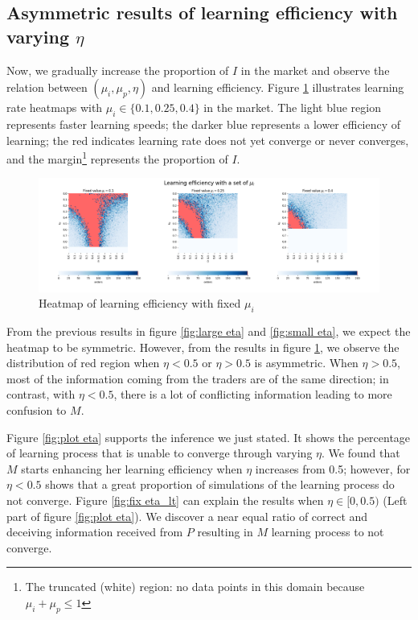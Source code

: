 \documentclass{article}
\begin{document}
\subsection{Asymmetric results of learning efficiency with varying $\eta$}
Now, we gradually increase the proportion of $I$ in the market and observe the relation between $(\mu_i, \mu_p, \eta)$ and learning efficiency. Figure \ref{fig:fix mu_i} illustrates learning rate heatmaps with $\mu_i \in \{0.1, 0.25, 0.4\}$ in the market. The light blue region represents faster learning speeds; the darker blue represents a lower efficiency of learning; the red indicates learning rate does not yet converge or never converges, and the margin\footnote{The truncated (white) region: no data points in this domain because $\mu_i + \mu_p \leq 1$} represents the proportion of $I$. 

\begin{figure}[ht]
    \centering
    \includegraphics[width=\textwidth]{v3_fig3_heatmap_fixed_mu_i.png}
    \caption{Heatmap of learning efficiency with fixed $\mu_i$}
    \label{fig:fix mu_i}
\end{figure}

From the previous results in figure \ref{fig:large eta} and \ref{fig:small eta}, we expect the heatmap to be symmetric. However, from the results in figure \ref{fig:fix mu_i}, we observe the distribution of red region when $\eta < 0.5$ or $\eta > 0.5$ is asymmetric. When $\eta > 0.5$, most of the information coming from the traders are of the same direction; in contrast, with $\eta < 0.5$, there is a lot of conflicting information leading to more confusion to $M$.

Figure \ref{fig:plot eta} supports the inference we just stated. It shows the percentage of learning process that is unable to converge through varying $\eta$. We found that $M$ starts enhancing her learning efficiency when $\eta$ increases from 0.5; however, for $\eta < 0.5$ shows that a great proportion of simulations of the learning process do not converge. Figure \ref{fig:fix eta_lt} can explain the results when $\eta \in [0, 0.5)$ (Left part of figure \ref{fig:plot eta}). We discover a near equal ratio of correct and deceiving information received from $P$ resulting in $M$ learning process to not converge.
\end{document}
